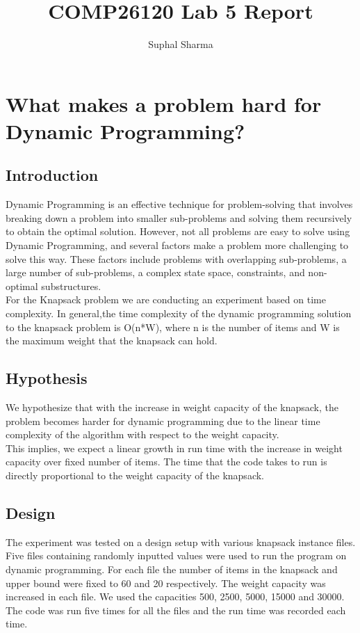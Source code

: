 \documentclass[a4]{article}
\title{COMP26120 Lab 5 Report}
\author{Suphal Sharma}
\begin{document}
\maketitle

\section{What makes a problem hard for Dynamic Programming?}
\subsection{Introduction}
Dynamic Programming is an effective technique for problem-solving that involves breaking down a problem into smaller sub-problems and solving them recursively to obtain the optimal solution. However, not all problems are easy to solve using Dynamic Programming, and several factors make a problem more challenging to solve this way. These factors include problems with overlapping sub-problems, a large number of sub-problems, a complex state space, constraints, and non-optimal substructures.\\
For the Knapsack problem we are conducting an experiment based on time complexity. In general,the time complexity of the dynamic programming solution to the knapsack problem is O(n*W), where n is the number of items and W is the maximum weight that the knapsack can hold.
\subsection{Hypothesis}
We hypothesize that with the increase in weight capacity of the knapsack, the problem becomes harder for dynamic programming due to the linear time complexity of the algorithm with respect to the weight capacity.\\
This implies, we expect a linear growth in run time with the increase in weight capacity over fixed number of items. The time that the code takes to run is directly proportional to the weight capacity of the knapsack.
\subsection{Design}
The experiment was tested on a design setup with various knapsack instance files. Five files containing randomly inputted values were used to run the program on dynamic programming. For each file the number of items in the knapsack and upper bound were fixed to 60 and 20 respectively. The weight capacity was increased in each file. We used the capacities 500, 2500, 5000, 15000 and 30000. The code was run five times for all the files and the run time was recorded each time.
\end{document}
